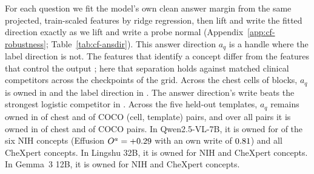 \documentclass{article}
\begin{document}
For each question we fit the model's own clean answer margin from the same projected, train-scaled features by ridge regression, then lift and write the fitted direction exactly as we lift and write a probe normal (Appendix~\ref{app:cf-robustness}; Table~\ref{tab:cf-ansdir}). This answer direction $a_q$ is a handle where the label direction is not. The features that identify a concept differ from the features that control the output \citep{arad2025saes}; here that separation holds against matched clinical competitors across the checkpoints of the grid. Across the \cfAnsChestN{} chest cells of \cfAnsChestBlocks{} blocks, $a_q$ is owned in \cfAnsChestOwnedA{} and the label direction in \cfAnsChestOwnedLabel{}. The answer direction's write beats the strongest logistic competitor in \cfAnsChestBeats{}. Across the five held-out templates, $a_q$ remains owned in \cfAnsdirtChestKept{} of \cfAnsdirtChestKeptN{} chest and \cfAnsdirtCocoKept{} of \cfAnsdirtCocoKeptN{} COCO (cell, template) pairs, and over all pairs it is owned in \cfAnsdirtChestOwnedPairs{} of \cfAnsdirtChestPairsAll{} chest and \cfAnsdirtCocoOwnedPairs{} of \cfAnsdirtCocoPairsAll{} COCO pairs. In Qwen2.5-VL-7B, it is owned for \cfAnsQwenOwnedNih{} of the six NIH concepts (Effusion $O^a=+0.29$ with an own write of $0.81$) and all \cfAnsQwenOwnedChex{} CheXpert concepts. In Lingshu 32B, it is owned for \cfAnsLingOwnedNih{} NIH and \cfAnsLingOwnedChex{} CheXpert concepts. In Gemma~3 12B, it is owned for \cfAnsGemOwnedNih{} NIH and \cfAnsGemOwnedChex{} CheXpert concepts.
\end{document}
